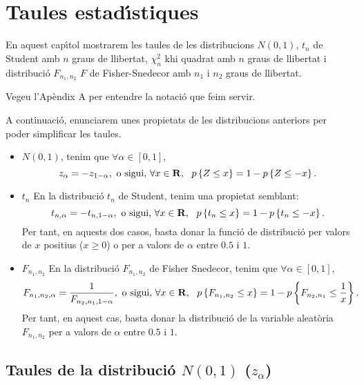 \chapter{Taules estad\'{\i}stiques}

En aquest cap\'{\i}tol mostrarem les taules de les distribucions $N(0,1)$,
$t_n$ de Student amb $n$ graus de llibertat, $\chi_n^2$ khi quadrat amb
$n$ graus de llibertat i distribuci\'o $F_{n_1,n_2}$ $F$ de Fisher-Snedecor
amb $n_1$ i $n_2$ graus de llibertat.

Vegeu l'Ap\`endix A 
per entendre la notaci\'o que feim servir.

A continuaci\'o, enunciarem unes propietats de les
distribucions anteriors per poder simplificar les taules.

\begin{itemize}
\item $N(0,1)$, tenim que $\forall\alpha\in [0,1]$, 
$$z_{\alpha}=-z_{1-\alpha},\hbox{ o sigui, }\forall x\in{\bf R},\ \ p\left\{Z\leq
x\right\}=1-p\left\{Z\leq -x\right\}.$$

\item $t_n$
En la distribuci\'o $t_n$ de Student, tenim una propietat semblant:
$$t_{n,\alpha}=-t_{n,1-\alpha},\hbox{ o sigui, }\forall x\in{\bf R},\ \ p\left\{t_n\leq
x\right\}=1-p\left\{t_n\leq -x\right\}.$$
Per tant, en aquests dos casos, basta donar la funci\'o de distribuci\'o per
valors de $x$ positius ($x\geq 0$) o per a valors de $\alpha$ entre $0.5$ i
$1$. 

\item $F_{n_1,n_2}$
En la distribuci\'o $F_{n_1,n_2}$ de Fisher Snedecor, tenim que
$\forall\alpha\in[0,1]$,
$$F_{n_1,n_2,\alpha}={1\over F_{n_2,n_1,1-\alpha}},
\hbox{ o sigui, }\forall x\in{\bf R},\ \ p\left\{F_{n_1,n_2}\leq x\right\}=
1-p\left\{F_{n_2,n_1}\leq {1\over x}\right\}.$$
Per tant, en aquest cas, basta donar la distribuci\'o de la variable 
aleat\`oria
$F_{n_1,n_2}$ per a valors de $\alpha$ entre $0.5$ i $1$.
\end{itemize}

\newpage
\section{Taules de la distribuci\'o $N(0,1)$ ($z_{\alpha}$)}



